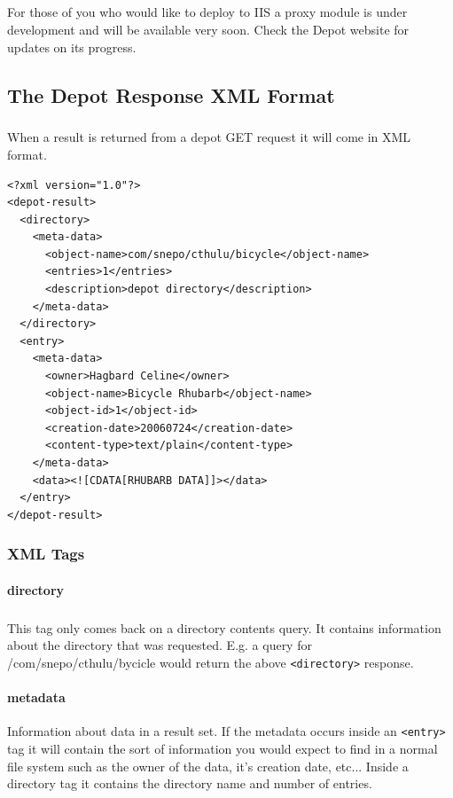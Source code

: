 \documentclass{report}
\begin{document}
\paragraph{}
For those of you who would like to deploy to IIS a proxy module is
under development and will be available very soon. Check the Depot
website for updates on its progress.


\begin{appendices}
\chapter{The Depot Response XML Format}


\paragraph{}
When a result is returned from a depot GET request it will come in XML
format. 
\begin{Verbatim}[frame=single]
<?xml version="1.0"?>
<depot-result>
  <directory>
    <meta-data>
      <object-name>com/snepo/cthulu/bicycle</object-name>
      <entries>1</entries>
      <description>depot directory</description>
    </meta-data>
  </directory>
  <entry>
    <meta-data>
      <owner>Hagbard Celine</owner>
      <object-name>Bicycle Rhubarb</object-name>
      <object-id>1</object-id>
      <creation-date>20060724</creation-date>
      <content-type>text/plain</content-type>
    </meta-data>
    <data><![CDATA[RHUBARB DATA]]></data>
  </entry>
</depot-result>
\end{Verbatim}

\subsection{XML Tags}

\subsubsection{directory}
\paragraph{}
This tag only comes back on a directory contents query. It contains
information about the directory that was requested. E.g. a query for
/com/snepo/cthulu/bycicle would return the above \texttt{<directory>}
response.

\subsubsection{metadata}
Information about data in a result set. If the metadata occurs inside
an \texttt{<entry>} tag it will contain the sort of information you
would expect to find in a normal file system such as the owner of the
data, it's creation date, etc... Inside a directory tag it contains
the directory name and number of entries.


\end{appendices}
\end{document}
